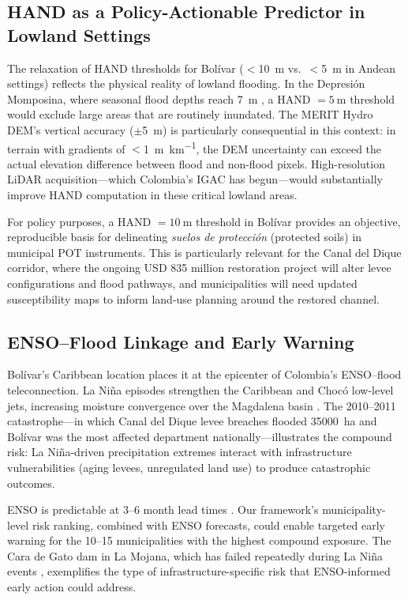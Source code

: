 \documentclass{article}
\begin{document}
\subsection{HAND as a Policy-Actionable Predictor in Lowland Settings}

The relaxation of HAND thresholds for Bol\'ivar ($<$\SI{10}{\metre} vs.\ $<$\SI{5}{\metre} in Andean settings) reflects the physical reality of lowland flooding. In the Depresi\'on Momposina, where seasonal flood depths reach \SI{7}{\metre} \citep{Angarita2018}, a HAND $= \SI{5}{\metre}$ threshold would exclude large areas that are routinely inundated. The MERIT Hydro DEM's vertical accuracy ($\pm$\SI{5}{\metre}) is particularly consequential in this context: in terrain with gradients of $<$\SI{1}{\metre\per\kilo\metre}, the DEM uncertainty can exceed the actual elevation difference between flood and non-flood pixels. High-resolution LiDAR acquisition---which Colombia's IGAC has begun---would substantially improve HAND computation in these critical lowland areas.

For policy purposes, a HAND $= \SI{10}{\metre}$ threshold in Bol\'ivar provides an objective, reproducible basis for delineating \textit{suelos de protecci\'on} (protected soils) in municipal POT instruments. This is particularly relevant for the Canal del Dique corridor, where the ongoing USD 835 million restoration project \citep{Mogollon2016} will alter levee configurations and flood pathways, and municipalities will need updated susceptibility maps to inform land-use planning around the restored channel.

\subsection{ENSO--Flood Linkage and Early Warning}

Bol\'ivar's Caribbean location places it at the epicenter of Colombia's ENSO--flood teleconnection. La Ni\~na episodes strengthen the Caribbean and Choc\'o low-level jets, increasing moisture convergence over the Magdalena basin \citep{Poveda2001, PovedalMesa1997, Salas2023}. The 2010--2011 catastrophe---in which Canal del Dique levee breaches flooded \SI{35000}{\hectare} and Bol\'ivar was the most affected department nationally---illustrates the compound risk: La Ni\~na-driven precipitation extremes interact with infrastructure vulnerabilities (aging levees, unregulated land use) to produce catastrophic outcomes.

ENSO is predictable at 3--6 month lead times \citep{Tippett2012}. Our framework's municipality-level risk ranking, combined with ENSO forecasts, could enable targeted early warning for the 10--15 municipalities with the highest compound exposure. The Cara de Gato dam in La Mojana, which has failed repeatedly during La Ni\~na events \citep{ACAPS2024}, exemplifies the type of infrastructure-specific risk that ENSO-informed early action could address.
\end{document}
